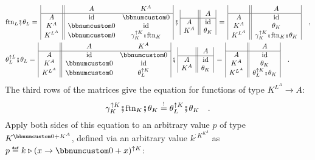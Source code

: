 \begin{align*}
 & \text{ftn}_{L}\bef\theta_{L}=\,\begin{array}{|c||cc|}
 & A & K^{A}\\
\hline A & \text{id} & \bbnum 0\\
K^{A} & \bbnum 0 & \text{id}\\
K^{L^{A}} & \bbnum 0 & \gamma_{K}^{\uparrow K}\bef\text{ftn}_{K}
\end{array}\,\bef\,\begin{array}{|c||c|}
 & A\\
\hline A & \text{id}\\
K^{A} & \theta_{K}
\end{array}\,=\,\begin{array}{|c||c|}
 & A\\
\hline A & \text{id}\\
K^{A} & \theta_{K}\\
K^{L^{A}} & \gamma_{K}^{\uparrow K}\bef\text{ftn}_{K}\bef\theta_{K}
\end{array}\quad,\\
 & \theta_{L}^{\uparrow L}\bef\theta_{L}=\,\begin{array}{|c||cc|}
 & A & K^{A}\\
\hline A & \text{id} & \bbnum 0\\
K^{A} & \bbnum 0 & \text{id}\\
K^{L^{A}} & \bbnum 0 & \theta_{L}^{\uparrow K}
\end{array}\,\bef\,\begin{array}{|c||c|}
 & A\\
\hline A & \text{id}\\
K^{A} & \theta_{K}
\end{array}\,=\,\begin{array}{|c||c|}
 & A\\
\hline A & \text{id}\\
K^{A} & \theta_{K}\\
K^{L^{A}} & \theta_{L}^{\uparrow K}\bef\theta_{K}
\end{array}\quad.
\end{align*}
The third rows of the matrices give the equation for functions of
type $K^{L^{A}}\rightarrow A$:
\[
\gamma_{K}^{\uparrow K}\bef\text{ftn}_{K}\bef\theta_{K}\overset{!}{=}\theta_{L}^{\uparrow K}\bef\theta_{K}\quad.
\]
Apply both sides of this equation to an arbitrary value $p$ of type
$K^{\bbnum 0+K^{A}}$, defined via an arbitrary value $k^{:K^{K^{A}}}$
as $p\triangleq k\triangleright(x\rightarrow\bbnum 0+x)^{\uparrow K}$:
